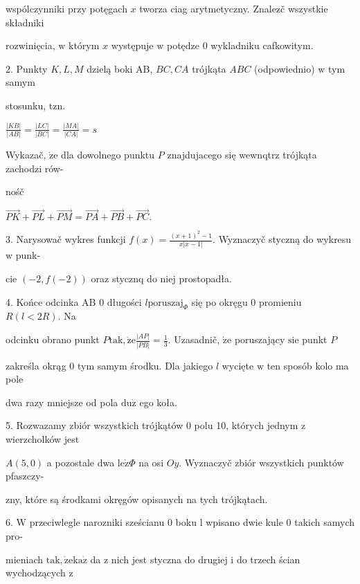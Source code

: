 \documentclass[a4paper,12pt]{article}
\begin{document}
wspólczynniki przy potęgach $x$ tworza ciag arytmetyczny. Znalez$\acute{}$č wszystkie składniki

rozwinięcia, $\mathrm{w}$ którym $x$ występuje $\mathrm{w}$ potędze $0$ wykladniku cafkowitym.

2. Punkty $K, L, M$ dzielą boki AB, $BC, CA$ trójkąta $ABC$ (odpowiednio) $\mathrm{w}$ tym samym

stosunku, $\mathrm{t}\mathrm{z}\mathrm{n}.$

$\displaystyle \frac{|KB|}{|AB|}=\frac{|LC|}{|BC|}=\frac{|MA|}{|CA|}=s$

Wykazač, $\dot{\mathrm{z}}\mathrm{e}$ dla dowolnego punktu $P$ znajdujacego się wewnqtrz trójkąta zachodzi rów-

nośč

$\vec{PK}+\vec{PL}+\vec{PM}=\vec{PA}+\vec{PB}+\vec{PC}.$

3. Narysowač wykres funkcji $f(x)=\displaystyle \frac{(x+1)^{2}-1}{x|x-1|}$. Wyznaczyč styczną do wykresu $\mathrm{w}$ punk-

cie $(-2,f(-2))$ oraz stycznq do niej prostopadła.

4. Końce odcinka AB $0$ długości $l\mathrm{p}\mathrm{o}\mathrm{r}\mathrm{u}\mathrm{s}\mathrm{z}\mathrm{a}\mathrm{j}_{\Phi}$ się po okręgu $0$ promieniu $R (l<2R)$. Na

odcinku obrano punkt $P\mathrm{t}\mathrm{a}\mathrm{k}, \dot{\mathrm{z}}\mathrm{e} \displaystyle \frac{|AP|}{|PB|} = \displaystyle \frac{1}{3}$. Uzasadnič, $\dot{\mathrm{z}}\mathrm{e}$ poruszający $\mathrm{s}\mathrm{i}\mathrm{e}$ punkt $P$

zakreśla okrąg $0$ tym samym środku. Dla jakiego $l$ wycięte $\mathrm{w}$ ten sposób kolo ma pole

dwa razy mniejsze od pola $\mathrm{d}\mathrm{u}\dot{\mathrm{z}}$ ego koła.

5. Rozwazamy zbiór wszystkich trójkątów $0$ polu 10, których jednym $\mathrm{z}$ wierzcholków jest

$A(5,0)$ a pozostale dwa $\mathrm{l}\mathrm{e}\dot{\mathrm{z}}\Phi$ na osi $Oy$. Wyznaczyč zbiór wszystkich punktów pfaszczy-

zny, które są środkami okręgów opisanych na tych trójkątach.

6. $\mathrm{W}$ przeciwlegle narozniki sześcianu $0$ boku l wpisano dwie kule $0$ takich samych pro-

mieniach $\mathrm{t}\mathrm{a}\mathrm{k}, \dot{\mathrm{z}}\mathrm{e}\mathrm{k}\mathrm{a}\dot{\mathrm{z}}$ da $\mathrm{z}$ nich jest styczna do drugiej $\mathrm{i}$ do trzech ścian wychodzących $\mathrm{z}$
\end{document}
